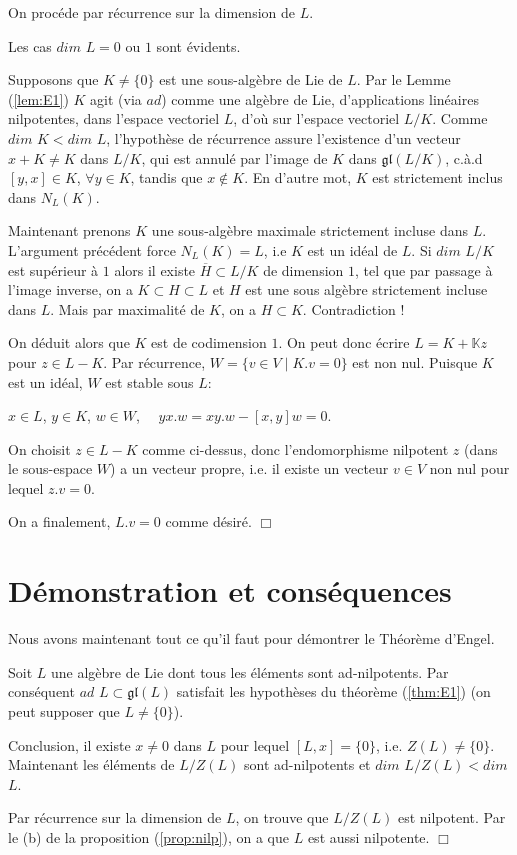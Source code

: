 \documentclass[a4paper,openany,12pt]{report}
\newcommand{\KK}{\mathbb{K}}
\newcommand{\gl}{\mathfrak{gl}}
\theoremstyle{break}
{\theorembodyfont{\upshape}
\newtheorem*{rmq}{Remarque :}
\newtheorem*{prv}{Preuve :}
\newtheorem*{ex}{Exemples :}
\newtheorem*{exe}{Exemple : }
\newtheorem*{nota}{Notation :}
\newtheorem*{dem}{D\'emonstration :}}
\begin{document}
\begin{dem}
\quad On procéde par récurrence sur la dimension de $L$.

Les cas $dim$ $L = 0$ ou $1$ sont évidents.

Supposons que $K \neq \{0\}$ est une sous-algèbre de Lie de $L$. Par le Lemme (\ref{lem:E1}) $K$ agit (via $ad$) comme une algèbre de Lie, d'applications linéaires nilpotentes, dans l'espace vectoriel $L$, d'où sur l'espace vectoriel $L/K$. Comme $dim$ $K < dim$ $L$, l'hypothèse de récurrence assure l’existence d'un vecteur $x + K \neq K $ dans $L/K$, qui est annulé par l'image de $K$ dans $\gl(L/K)$, c.à.d $[y,x] \in K$, $\forall y \in K$, tandis que $x \notin K$. En d'autre mot, $K$ est strictement inclus dans $N_{L}(K)$.

Maintenant prenons $K$ une sous-algèbre maximale strictement incluse dans $L$. L'argument précédent force $N_{L}(K) = L$, i.e $K$ est un idéal de $L$. Si $dim$ $L/K$ est supérieur à $1$ alors il existe $\overline{H} \subset L/K$ de dimension $1$, tel que par passage à l'image inverse, on a $K \subset H \subset L$ et $H$ est une sous algèbre strictement incluse dans $L$. Mais par maximalité de $K$, on a $H \subset K$. Contradiction !

On déduit alors que $K$ est de codimension $1$. On peut donc écrire $L=K+ \KK z$ pour $z \in L-K$. Par récurrence, $W = \{ v \in V \mid K.v = 0\}$ est non nul. Puisque $K$ est un idéal, $W$ est stable sous $L$: 
\begin{center}
$x \in L$, $y \in K$, $w \in W$, $\quad yx.w = xy.w - [x,y]w =0$.
\end{center}
\quad On choisit $z \in L-K$ comme ci-dessus, donc l'endomorphisme nilpotent $z$ (dans le sous-espace $W$) a un vecteur propre, i.e. il existe un vecteur $v \in V$ non nul pour lequel $z.v = 0$.

On a finalement, $L.v = 0$ comme désiré. $\Box$
\end{dem}

\section{Démonstration et conséquences}

Nous avons maintenant tout ce qu'il faut pour démontrer le Théorème d'Engel.

\begin{dem}
\quad Soit $L$ une algèbre de Lie dont tous les éléments sont ad-nilpotents. Par conséquent $ad$ $L \subset \gl(L)$  satisfait les hypothèses du théorème (\ref{thm:E1}) (on peut supposer que $L \neq \{0 \}$).

Conclusion, il existe $x \neq 0$ dans $L$ pour lequel $[L,x]=\{0\}$, i.e. $Z(L) \neq \{0\}$. Maintenant les éléments de $L/Z(L)$ sont ad-nilpotents et $dim$ $L/Z(L) < dim$ $L$.

Par récurrence sur la dimension de $L$, on  trouve que $L/Z(L)$ est nilpotent. Par le (b) de la proposition (\ref{prop:nilp}), on a que $L$ est aussi nilpotente. $\Box$
\end{dem}
\end{document}
